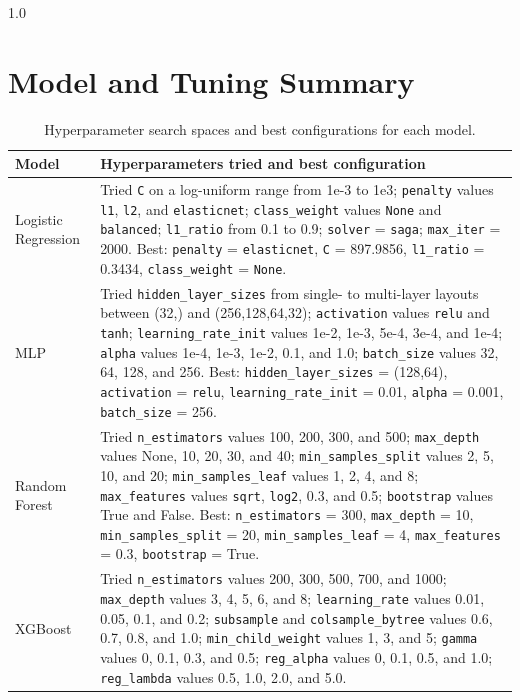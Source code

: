 \begin{spacing}{1.0}
\section{Model and Tuning Summary}
\begin{table}[htbp]
    \centering
    \footnotesize
    \setlength{\tabcolsep}{3pt}
    \caption{Hyperparameter search spaces and best configurations for each model.}
    \label{tab:model-tuning-summary}
    \begin{tabularx}{\linewidth}{>{\raggedright\arraybackslash}p{2.5cm} X}
        \toprule
        Model & Hyperparameters tried and best configuration \\
        \midrule
        Logistic Regression &
        Tried \texttt{C} on a log-uniform range from 1e-3 to 1e3; \texttt{penalty} values \texttt{l1}, \texttt{l2}, and \texttt{elasticnet}; \texttt{class\_weight} values \texttt{None} and \texttt{balanced}; \texttt{l1\_ratio} from 0.1 to 0.9; \texttt{solver} = \texttt{saga}; \texttt{max\_iter} = 2000.
        Best: \texttt{penalty} = \texttt{elasticnet}, \texttt{C} = 897.9856, \texttt{l1\_ratio} = 0.3434, \texttt{class\_weight} = \texttt{None}. \\
        \addlinespace[0.3em]
        MLP &
        Tried \texttt{hidden\_layer\_sizes} from single- to multi-layer layouts between (32,) and (256,128,64,32); \texttt{activation} values \texttt{relu} and \texttt{tanh}; \texttt{learning\_rate\_init} values 1e-2, 1e-3, 5e-4, 3e-4, and 1e-4; \texttt{alpha} values 1e-4, 1e-3, 1e-2, 0.1, and 1.0; \texttt{batch\_size} values 32, 64, 128, and 256.
        Best: \texttt{hidden\_layer\_sizes} = (128,64), \texttt{activation} = \texttt{relu}, \texttt{learning\_rate\_init} = 0.01, \texttt{alpha} = 0.001, \texttt{batch\_size} = 256. \\
        \addlinespace[0.3em]
        Random Forest &
        Tried \texttt{n\_estimators} values 100, 200, 300, and 500; \texttt{max\_depth} values None, 10, 20, 30, and 40; \texttt{min\_samples\_split} values 2, 5, 10, and 20; \texttt{min\_samples\_leaf} values 1, 2, 4, and 8; \texttt{max\_features} values \texttt{sqrt}, \texttt{log2}, 0.3, and 0.5; \texttt{bootstrap} values True and False.
        Best: \texttt{n\_estimators} = 300, \texttt{max\_depth} = 10, \texttt{min\_samples\_split} = 20, \texttt{min\_samples\_leaf} = 4, \texttt{max\_features} = 0.3, \texttt{bootstrap} = True. \\
        \addlinespace[0.3em]
        XGBoost &
        Tried \texttt{n\_estimators} values 200, 300, 500, 700, and 1000; \texttt{max\_depth} values 3, 4, 5, 6, and 8; \texttt{learning\_rate} values 0.01, 0.05, 0.1, and 0.2; \texttt{subsample} and \texttt{colsample\_bytree} values 0.6, 0.7, 0.8, and 1.0; \texttt{min\_child\_weight} values 1, 3, and 5; \texttt{gamma} values 0, 0.1, 0.3, and 0.5; \texttt{reg\_alpha} values 0, 0.1, 0.5, and 1.0; \texttt{reg\_lambda} values 0.5, 1.0, 2.0, and 5.0.

\end{tabularx}
\end{table}
\end{spacing}
